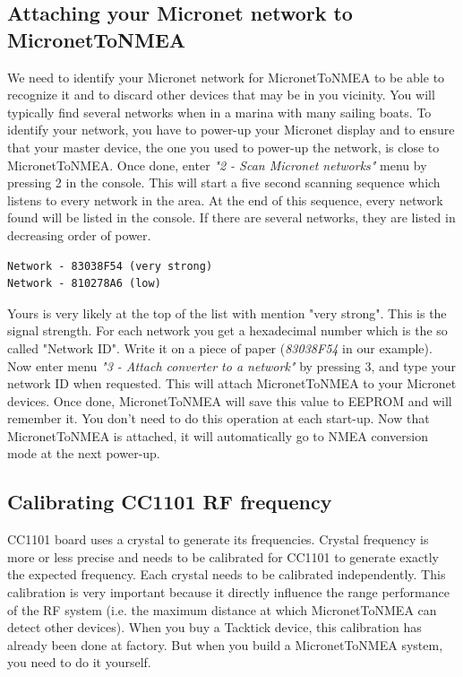 \documentclass{report}
\begin{document}
\subsection{Attaching your Micronet network to MicronetToNMEA}

We need to identify your Micronet network for MicronetToNMEA to be able to recognize it and to discard other devices that may be in you vicinity. You will typically find several networks when in a marina with many sailing boats.
To identify your network, you have to power-up your Micronet display and to ensure that your master device, the one you used to power-up the network, is close to MicronetToNMEA. Once done, enter \emph{"2 - Scan Micronet networks"} menu by pressing 2 in the console. This will start a five second scanning sequence which listens to every network in the area. At the end of this sequence, every network found will be listed in the console. If there are several networks, they are listed in decreasing order of power.

\begin{verbatim}
Network - 83038F54 (very strong)
Network - 810278A6 (low)
\end{verbatim}

Yours is very likely at the top of the list with mention "very strong". This is the signal strength. For each network you get a hexadecimal number which is the so called "Network ID". Write it on a piece of paper (\emph{83038F54} in our example).
Now enter menu \emph{"3 - Attach converter to a network"} by pressing 3, and type your network ID when requested. This will attach MicronetToNMEA to your Micronet devices.
Once done, MicronetToNMEA will save this value to EEPROM and will remember it. You don't need to do this operation at each start-up. Now that MicronetToNMEA is attached, it will automatically go to NMEA conversion mode at the next power-up.

\subsection{Calibrating CC1101 RF frequency}

CC1101 board uses a crystal to generate its frequencies. Crystal frequency is more or less precise and needs to be calibrated for CC1101 to generate exactly the expected frequency. Each crystal needs to be calibrated independently. This calibration is very important because it directly influence the range performance of the RF system (i.e. the maximum distance at which MicronetToNMEA can detect other devices). When you buy a Tacktick device, this calibration has already been done at factory. But when you build a MicronetToNMEA system, you need to do it yourself.
\end{document}
